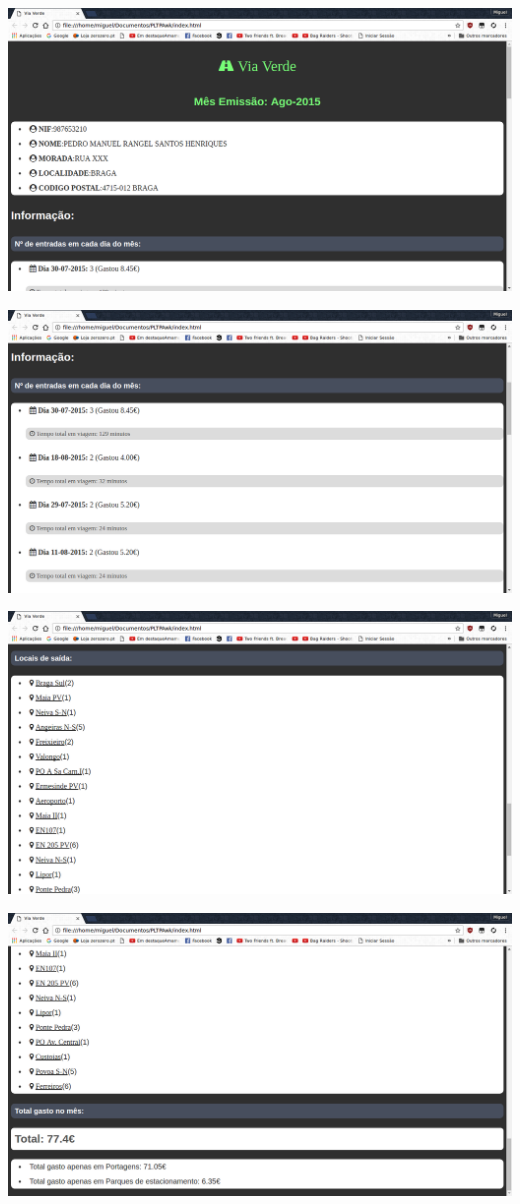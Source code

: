\documentclass{report}
\begin{document}
\includegraphics[scale=0.35]{out1.png}\par
\includegraphics[scale=0.35]{out2.png}\par
\includegraphics[scale=0.35]{out3.png}\par
\includegraphics[scale=0.35]{out4.png}
\end{document}
